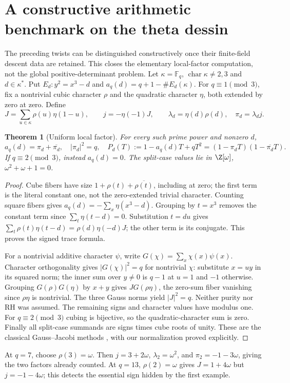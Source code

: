 \documentclass[11pt,oneside,openany]{book}
\newtheorem{theorem}{Theorem}[chapter]
\theoremstyle{definition}\newtheorem{definition}[theorem]{Definition}
\theoremstyle{remark}\newtheorem{remark}[theorem]{Remark}
\begin{document}
\section{A constructive arithmetic benchmark on the theta dessin}
The preceding twists can be distinguished constructively once their finite-field descent data are retained. This closes the elementary local-factor computation, not the global positive-determinant problem. Let $\kappa=\mathbb F_q$, $\operatorname{char}\kappa\ne2,3$ and $d\in\kappa^*$. Put $E_d:y^2=x^3-d$ and $a_q(d)=q+1-\#E_d(\kappa)$. For $q\equiv1\pmod3$, fix a nontrivial cubic character $\rho$ and the quadratic character $\eta$, both extended by zero at zero. Define
\[
 J=\sum_{u\in\kappa}\rho(u)\eta(1-u),\qquad
 j=-\eta(-1)J,\qquad \lambda_d=\eta(d)\rho(d),\quad \pi_d=\lambda_dj.
\]
\begin{theorem}[Uniform local factor]\label{thm:jacobitheta}
For every such prime power and nonzero $d$,
\[
 a_q(d)=\pi_d+\overline{\pi_d},\quad |\pi_d|^2=q,\quad
 P_d(T):=1-a_q(d)T+qT^2=(1-\pi_dT)(1-\overline{\pi_d}T).
\]
If $q\equiv2\pmod3$, instead $a_q(d)=0$. The split-case values lie in $\Z[\omega]$, $\omega^2+\omega+1=0$.
\end{theorem}
\begin{proof}
Cube fibers have size $1+\rho(t)+\overline{\rho(t)}$, including at zero; the first term is the literal constant one, not the zero-extended trivial character. Counting square fibers gives $a_q(d)=-\sum_x\eta(x^3-d)$. Grouping by $t=x^3$ removes the constant term since $\sum_t\eta(t-d)=0$. Substitution $t=du$ gives $\sum_t\rho(t)\eta(t-d)=\rho(d)\eta(-d)J$; the other term is its conjugate. This proves the signed trace formula.

For a nontrivial additive character $\psi$, write $G(\chi)=\sum_x\chi(x)\psi(x)$. Character orthogonality gives $|G(\chi)|^2=q$ for nontrivial $\chi$: substitute $x=uy$ in its squared norm; the inner sum over $y\ne0$ is $q-1$ at $u=1$ and $-1$ otherwise. Grouping $G(\rho)G(\eta)$ by $x+y$ gives $JG(\rho\eta)$, the zero-sum fiber vanishing since $\rho\eta$ is nontrivial. The three Gauss norms yield $|J|^2=q$. Neither purity nor RH was assumed. The remaining signs and character values have modulus one. For $q\equiv2\pmod3$ cubing is bijective, so the quadratic-character sum is zero. Finally all split-case summands are signs times cube roots of unity. These are the classical Gauss--Jacobi methods \cite[pp.499--502]{WeilJacobi}, with our normalization proved explicitly.
\end{proof}
At $q=7$, choose $\rho(3)=\omega$. Then $j=3+2\omega$, $\lambda_2=\omega^2$, and $\pi_2=-1-3\omega$, giving the two factors already counted. At $q=13$, $\rho(2)=\omega$ gives $J=1+4\omega$ but $j=-1-4\omega$; this detects the essential sign hidden by the first example.
\end{document}
